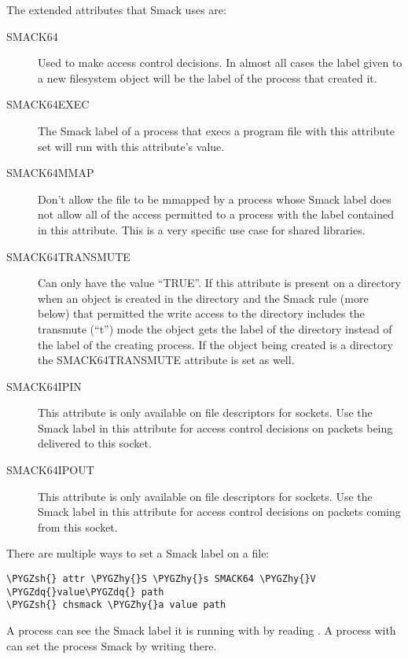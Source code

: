 \documentclass[a4paper,8pt,english]{sphinxmanual}
\def\PYGZsh{\char`\#}
\def\PYGZhy{\char`\-}
\def\PYGZdq{\char`\"}
\begin{document}
The extended attributes that Smack uses are:
\begin{description}
\item[{SMACK64}] \leavevmode
Used to make access control decisions. In almost all cases
the label given to a new filesystem object will be the label
of the process that created it.

\item[{SMACK64EXEC}] \leavevmode
The Smack label of a process that execs a program file with
this attribute set will run with this attribute's value.

\item[{SMACK64MMAP}] \leavevmode
Don't allow the file to be mmapped by a process whose Smack
label does not allow all of the access permitted to a process
with the label contained in this attribute. This is a very
specific use case for shared libraries.

\item[{SMACK64TRANSMUTE}] \leavevmode
Can only have the value ``TRUE''. If this attribute is present
on a directory when an object is created in the directory and
the Smack rule (more below) that permitted the write access
to the directory includes the transmute (``t'') mode the object
gets the label of the directory instead of the label of the
creating process. If the object being created is a directory
the SMACK64TRANSMUTE attribute is set as well.

\item[{SMACK64IPIN}] \leavevmode
This attribute is only available on file descriptors for sockets.
Use the Smack label in this attribute for access control
decisions on packets being delivered to this socket.

\item[{SMACK64IPOUT}] \leavevmode
This attribute is only available on file descriptors for sockets.
Use the Smack label in this attribute for access control
decisions on packets coming from this socket.

\end{description}

There are multiple ways to set a Smack label on a file:

\begin{Verbatim}[commandchars=\\\{\}]
\PYGZsh{} attr \PYGZhy{}S \PYGZhy{}s SMACK64 \PYGZhy{}V \PYGZdq{}value\PYGZdq{} path
\PYGZsh{} chsmack \PYGZhy{}a value path
\end{Verbatim}

A process can see the Smack label it is running with by
reading . A process with 
can set the process Smack by writing there.
\end{document}
